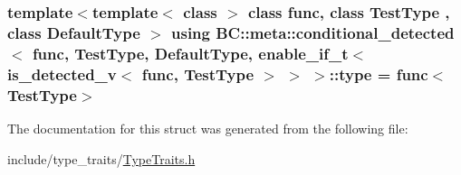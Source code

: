 \subsubsection[{\texorpdfstring{type}{type}}]{\setlength{\rightskip}{0pt plus 5cm}template$<$template$<$ class $>$ class func, class Test\+Type , class Default\+Type $>$ using {\bf B\+C\+::meta\+::conditional\+\_\+detected}$<$ func, Test\+Type, Default\+Type, enable\+\_\+if\+\_\+t$<$ is\+\_\+detected\+\_\+v$<$ func, Test\+Type $>$ $>$ $>$\+::{\bf type} =  func$<$Test\+Type$>$}\hypertarget{structBC_1_1meta_1_1conditional__detected_3_01func_00_01TestType_00_01DefaultType_00_01enable__i6e3832bf86481f306f12e7d1b8047f13_ac8eb688f5101d9401ca4d684b293b852}{}\label{structBC_1_1meta_1_1conditional__detected_3_01func_00_01TestType_00_01DefaultType_00_01enable__i6e3832bf86481f306f12e7d1b8047f13_ac8eb688f5101d9401ca4d684b293b852}


The documentation for this struct was generated from the following file\+:\begin{DoxyCompactItemize}
\item 
include/type\+\_\+traits/\hyperlink{TypeTraits_8h}{Type\+Traits.\+h}\end{DoxyCompactItemize}
